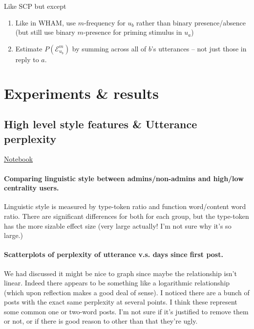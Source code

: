 \documentclass[12pt]{scrartcl}
\begin{document}
Like SCP but except
\begin{enumerate}
  \item Like in WHAM, use $m$-frequency for $u_b$ rather than binary presence/absence (but still use binary $m$-presence for priming stimulus in $u_a$)
  \item Estimate $P(\mathcal{E}^m_{u_b})$ by summing across all of $b$'s utterances -- not just those in reply to $a$.
\end{enumerate}

\section{Experiments \& results}

\subsection{High level style features \& Utterance perplexity} %

\href{https://github.com/winobes/lasn/blob/2991fdaa0023e038452dbfe13d0d325bb1783dfa/code/analysis.ipynb}{Notebook}

\paragraph{Comparing linguistic style between admins/non-admins and high/low centrality users.} Linguistic style is measured by type-token ratio and function word/content word ratio. There are significant differences for both for each group, but the type-token has the more sizable effect size (very large actually! I'm not sure why it's so large.)

\paragraph{Scatterplots of perplexity of utterance v.s. days since first post.} We had discussed it might be nice to graph since maybe the relationship isn't linear. Indeed there appears to be something like a logarithmic relationship (which upon reflection makes a good deal of sense). I noticed there are a bunch of posts with the exact same perplexity at several points. I think these represent some common one or two-word posts. I'm not sure if it's justified to remove them or not, or if there is good reason to other than that they're ugly.

\subsection{}
\end{document}
